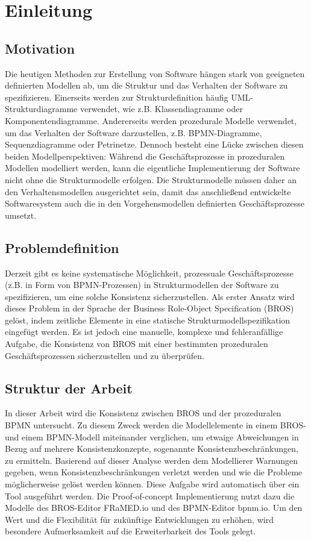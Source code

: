\chapter{Einleitung}

\section{Motivation}

Die heutigen Methoden zur Erstellung von Software hängen stark von geeigneten definierten Modellen ab, um die Struktur und das Verhalten der Software zu spezifizieren.
Einerseits werden zur Strukturdefinition häufig UML-Strukturdiagramme verwendet, wie z.B. Klassendiagramme oder Komponentendiagramme.
Andererseits werden prozedurale Modelle verwendet, um das Verhalten der Software darzustellen, z.B. BPMN-Diagramme, Sequenzdiagramme oder Petrinetze.
Dennoch besteht eine Lücke zwischen diesen beiden Modellperspektiven: Während die Geschäftsprozesse in prozeduralen Modellen modelliert werden, kann die eigentliche Implementierung der Software nicht ohne die Strukturmodelle erfolgen.
Die Strukturmodelle müssen daher an den Verhaltensmodellen ausgerichtet sein, damit das anschließend entwickelte Softwaresystem auch die in den Vorgehensmodellen definierten Geschäftsprozesse umsetzt.

\section{Problemdefinition}

Derzeit gibt es keine systematische Möglichkeit, prozessuale Geschäftsprozesse (z.B. in Form von BPMN-Prozessen) in Strukturmodellen der Software zu spezifizieren, um eine solche Konsistenz sicherzustellen.
Als erster Ansatz wird dieses Problem in der Sprache der Business Role-Object Specification (BROS) gelöst, indem zeitliche Elemente in eine statische Strukturmodellspezifikation eingefügt werden.
Es ist jedoch eine manuelle, komplexe und fehleranfällige Aufgabe, die Konsistenz von BROS mit einer bestimmten prozeduralen Geschäftsprozessen sicherzustellen und zu überprüfen.

\section{Struktur der Arbeit}

In dieser Arbeit wird die Konsistenz zwischen BROS und der prozeduralen BPMN untersucht.
Zu diesem Zweck werden die Modellelemente in einem BROS- und einem BPMN-Modell miteinander verglichen, um etwaige Abweichungen in Bezug auf mehrere Konsistenzkonzepte, sogenannte Konsistenzbeschränkungen, zu ermitteln.
Basierend auf dieser Analyse werden dem Modellierer Warnungen gegeben, wenn Konsistenzbeschränkungen verletzt werden und wie die Probleme möglicherweise gelöst werden können.
Diese Aufgabe wird automatisch über ein Tool ausgeführt werden. Die Proof-of-concept Implementierung nutzt dazu die Modelle des BROS-Editor FRaMED.io und des BPMN-Editor bpnm.io.
Um den Wert und die Flexibilität für zukünftige Entwicklungen zu erhöhen, wird besondere Aufmerksamkeit auf die Erweiterbarkeit des Tools gelegt.
